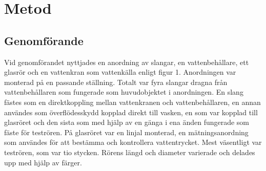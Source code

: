 \documentclass[a4paper,12pt]{article}
\begin{document}
\section{Metod}
%
\subsection{Genomförande}
    Vid genomförandet nyttjades en anordning av slangar, en vattenbehållare, ett glasrör och en vattenkran som vattenkälla enligt figur 1. Anordningen var monterad på en passande ställning. Totalt var fyra slangar dragna från vattenbehållaren som fungerade som huvudobjektet i anordningen. En slang fästes som en direktkoppling mellan vattenkranen och vattenbehållaren, en annan användes som överflödesskydd kopplad direkt till vasken, en som var kopplad till glasröret och den sista som med hjälp av en gänga i ena änden fungerade som fäste för teströren. På glasröret var en linjal monterad, en mätningsanordning som användes för att bestämma och kontrollera vattentrycket. Mest väsentligt var teströren, som var tio stycken. Rörens längd och diameter varierade och delades upp med hjälp av färger.
\end{document}
